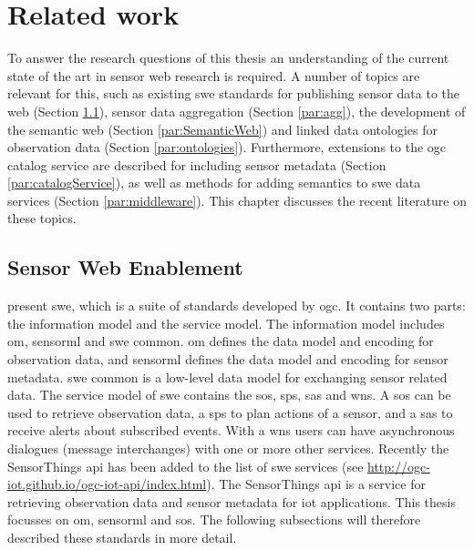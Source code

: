 

\chapter{Related work}
\label{chap:rw}
To answer the research questions of this thesis an understanding of the current state of the art in sensor web research is required. A number of topics are relevant for this, such as existing \ac{swe} standards for publishing sensor data to the web (Section \ref{par:SWE}), sensor data aggregation (Section \ref{par:agg}), the development of the semantic web (Section \ref{par:SemanticWeb}) and linked data ontologies for observation data (Section \ref{par:ontologies}). Furthermore, extensions to the \ac{ogc} catalog service are described for including sensor metadata (Section \ref{par:catalogService}), as well as methods for adding semantics to \ac{swe} data services (Section \ref{par:middleware}). This chapter discusses the recent literature on these topics. 

\section{Sensor Web Enablement}
\label{par:SWE}
\cite{SW:OGC} present \acf{swe}, which is a suite of standards developed by \ac{ogc}. It contains two parts: the information model and the service model. The information model includes \ac{om}, \ac{sensorml} and \ac{swe} common. \ac{om} defines the data model and encoding for observation data, and \ac{sensorml} defines the data model and encoding for sensor metadata. \ac{swe} common is a low-level data model for exchanging sensor related data. The service model of \ac{swe} contains the \ac{sos}, \ac{sps}, \ac{sas} and \ac{wns}. A \ac{sos} can be used to retrieve observation data, a \ac{sps} to plan actions of a sensor, and a \ac{sas} to receive alerts about subscribed events. With a \ac{wns} users can have asynchronous dialogues (message interchanges) with one or more other services. Recently the SensorThings \ac{api} has been added to the list of \ac{swe} services (see \url{http://ogc-iot.github.io/ogc-iot-api/index.html}). The SensorThings \ac{api} is a service for retrieving observation data and sensor metadata for \ac{iot} applications. This thesis focusses on \ac{om}, \ac{sensorml} and \ac{sos}. The following subsections will therefore described these standards in more detail.

